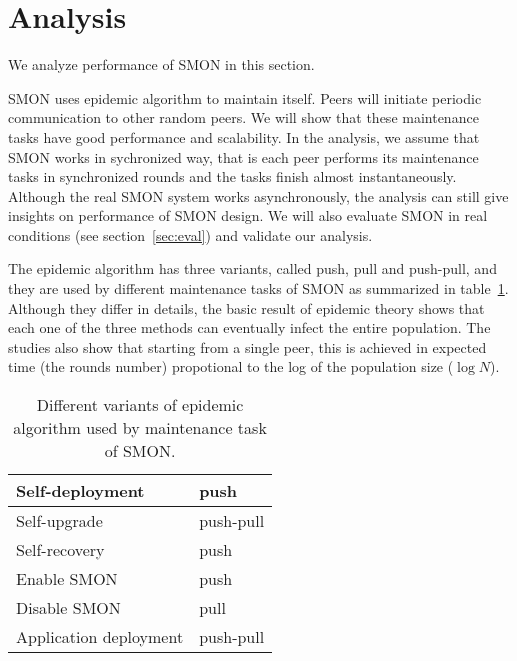\section{Analysis}
\label{sec:analysis}

We analyze performance of SMON in this section.

SMON uses epidemic algorithm to maintain itself. Peers will
initiate periodic communication to other random peers. We
will show that these maintenance tasks have good
performance and scalability. In the analysis, we assume that
SMON works in sychronized way, that is each peer performs
its maintenance tasks in synchronized rounds and the tasks
finish almost instantaneously. Although the real SMON system
works asynchronously, the analysis can still give insights
on performance of SMON design. We will also evaluate SMON in
real conditions (see section~\ref{sec:eval}) and validate
our analysis.


The epidemic algorithm has three variants, called push, pull
and push-pull, and they are used by different maintenance
tasks of SMON as summarized in table~\ref{tbl:tasks}.
Although they differ in details, the basic result of
epidemic theory shows that each one of the three methods can
eventually infect the entire population.  The studies also
show that starting from a single peer, this is achieved in
expected time (the rounds number) propotional to the log of
the population size ($\log N$).

\begin{table}
\centering
\begin{tabular}{|l|l|}

\hline
Self-deployment & push \\

\hline
Self-upgrade & push-pull \\

\hline
Self-recovery & push \\

\hline
Enable SMON & push \\

\hline
Disable SMON & pull \\

\hline
Application deployment & push-pull \\

\hline
\end{tabular}
\caption{Different variants of epidemic algorithm used by
maintenance task of SMON.}
\label{tbl:tasks}
\end{table}

